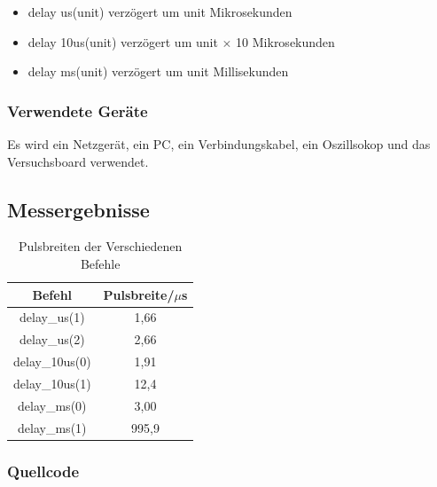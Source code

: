 \documentclass[12pt,a4paper]{article}
\begin{document}
\begin{itemize}
\item	delay us(unit) verzögert um unit Mikrosekunden

\item	delay 10us(unit) verzögert um unit $\times$ 10 Mikrosekunden

\item	delay ms(unit) verzögert um unit Millisekunden
\end{itemize}

\subsubsection*{Verwendete Geräte}

Es wird ein Netzgerät, ein PC, ein Verbindungskabel, ein Oszillsokop und das Versuchsboard verwendet.


\subsection*{Messergebnisse}
\begin{table}[H]
\centering
\begin{tabular}{|c|c|}
	\hline
	    Befehl     & Pulsbreite/$\mu$s \\ \hline\hline
	 delay\_us(1)  &       1,66        \\ \hline
	 delay\_us(2)  &       2,66        \\ \hline
	delay\_10us(0) &       1,91        \\ \hline
	delay\_10us(1) &       12,4        \\ \hline
	 delay\_ms(0)  &       3,00        \\ \hline
	 delay\_ms(1)  &       995,9       \\ \hline
\end{tabular} 
\caption{Pulsbreiten der Verschiedenen Befehle}
\label{tab:puls_1}
\end{table}


\subsubsection*{Quellcode}
\end{document}
